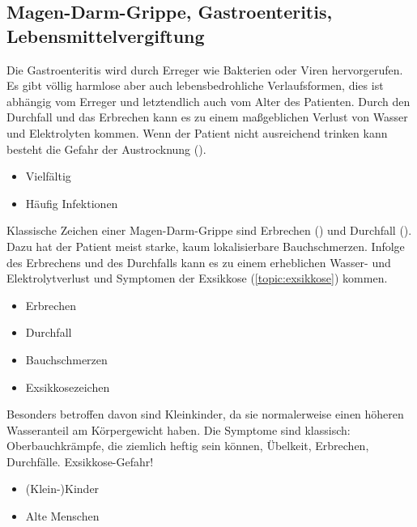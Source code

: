 \subsection{Magen-Darm-Grippe, Gastroenteritis,
Lebensmittelvergiftung}
\label{topic:gastroenteritis}%
\label{topic:lebensmittelvergiftung}%


{%
Die Gastroenteritis wird durch Erreger wie Bakterien oder
Viren hervorgerufen. Es gibt völlig harmlose aber auch
lebensbedrohliche Verlaufsformen, dies ist abhängig vom
Erreger und letztendlich auch vom Alter des Patienten. Durch
den Durchfall und das Erbrechen kann es zu einem maßgeblichen
Verlust von Wasser und Elektrolyten kommen. Wenn der Patient
nicht ausreichend trinken kann besteht die Gefahr der
Austrocknung (). 
}{
\begin{itemize}
  \item Vielfältig
  \item Häufig Infektionen
\end{itemize}
}{}{}{}


{
Klassische Zeichen einer Magen-Darm-Grippe sind Erbrechen
() und Durchfall (). Dazu hat
der Patient meist starke, kaum lokalisierbare
Bauchschmerzen. Infolge des 
Erbrechens und des Durchfalls kann es zu einem erheblichen 
Wasser- und Elektrolytverlust und Symptomen der Exsikkose
(\ref{topic:exsikkose}) kommen. 

}{
\begin{itemize}
    \item Erbrechen 
    \item Durchfall 
    \item Bauchschmerzen
    \item Exsikkosezeichen
\end{itemize}
}{}{}{}

{%
Besonders betroffen davon sind Kleinkinder, da sie
normalerweise einen höheren Wasseranteil am Körpergewicht
haben.  Die Symptome sind klassisch: Oberbauchkrämpfe,
die ziemlich heftig sein können, Übelkeit, Erbrechen, Durchfälle.
Exsikkose-Gefahr! 
}{
\begin{itemize}
    \item (Klein-)Kinder
    \item Alte Menschen
\end{itemize}
}{}{}{}


